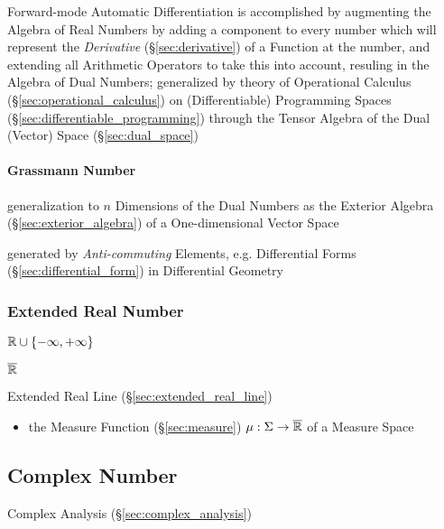 Forward-mode Automatic Differentiation is accomplished by augmenting the Algebra
of Real Numbers by adding a component to every number which will represent the
\emph{Derivative} (\S\ref{sec:derivative}) of a Function at the number, and
extending all Arithmetic Operators to take this into account, resuling in the
Algebra of Dual Numbers; generalized by theory of Operational Calculus
(\S\ref{sec:operational_calculus}) on (Differentiable) Programming Spaces
(\S\ref{sec:differentiable_programming}) through the Tensor Algebra of the Dual
(Vector) Space (\S\ref{sec:dual_space})



\paragraph{Grassmann Number}\label{sec:grassmann_number}\hfill

generalization to $n$ Dimensions of the Dual Numbers as the Exterior Algebra
(\S\ref{sec:exterior_algebra}) of a One-dimensional Vector Space

generated by \emph{Anti-commuting} Elements, e.g. Differential Forms
(\S\ref{sec:differential_form}) in Differential Geometry



\subsubsection{Extended Real Number}\label{sec:extended_real}

$\mathbb{R} \cup \{-\infty, +\infty\}$

$\overline{\mathbb{R}}$

Extended Real Line (\S\ref{sec:extended_real_line})

\begin{itemize}
  \item the Measure Function (\S\ref{sec:measure}) $\mu : \Sigma \rightarrow
    \overline{\mathbb{R}}$ of a Measure Space
\end{itemize}



\subsection{Complex Number}\label{sec:complex_number}

\fist Complex Analysis (\S\ref{sec:complex_analysis})

